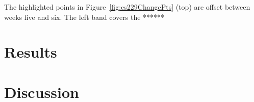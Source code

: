 The highlighted points in Figure~\ref{fig:cs229ChangePts} (top)
are offset between weeks five and six. The left band covers the ******

\section{Results}
\section{Discussion}
\label{sec:discussion}






